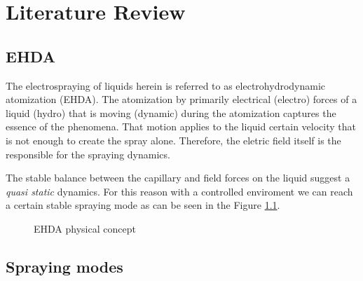 \chapter{Literature Review}
\label{chap:lit_review}


\section{EHDA}
\label{sec:ehda_resume}

The electrospraying of liquids herein is referred to as electrohydrodynamic atomization (EHDA). The atomization by primarily electrical (electro) forces of a liquid (hydro) that is moving (dynamic) during the atomization captures the essence of the phenomena.\cite{Grace}
That motion applies to the liquid certain velocity that is not enough to create the spray alone. Therefore, the eletric field itself is the responsible for the spraying dynamics.\cite{prunet}

The stable balance between the capillary and field forces on the liquid suggest a \emph{quasi static} dynamics.
For this reason with a controlled enviroment we can reach a certain stable spraying mode as can be seen in the Figure \ref{fig:ehda_setup_ex2}.

\begin{figure}[H]
  \centering
  \caption{EHDA physical concept \cite{Gabriel}}
  \label{fig:ehda_setup_ex2}
\end{figure}


\section{Spraying modes}
\label{sec:spraying_modes_subsec}

